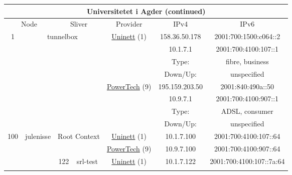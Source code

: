 \begin{small}
\begin{center}
\begin{longtable}{|c|c|c|c|c|c|c|c|}
\endfirsthead
\hline
 \multicolumn{8}{|c|}{\textbf{Universitetet i Agder (continued)}} \\ \hline
 \multicolumn{2}{|p{8em}|}{Node} & \multicolumn{2}{|p{8em}|}{Sliver} & \multicolumn{2}{|p{8em}|}{Provider} & IPv4 & IPv6 \\ \hline
\endhead
 \multirow{8}{*}{\tiny{1}} & \multicolumn{3}{|c|}{\multirow{8}{*}{\tiny{tunnelbox}}} & \multicolumn{2}{|c|}{\multirow{4}{*}{\tiny{\href{https://www.uninett.no}{Uninett} (1)}}} & \tiny{158.36.50.178} & \tiny{2001:700:1500:c064::2} \\* \cline{7-7}\cline{8-8}
  & \multicolumn{3}{|c|}{} & \multicolumn{2}{|c|}{} & \tiny{10.1.7.1} & \tiny{2001:700:4100:107::1} \\* \cline{7-7}\cline{8-8}
  & \multicolumn{3}{|c|}{} & \multicolumn{2}{|c|}{} & Type: & fibre, business \\* \cline{7-7}\cline{8-8}
  & \multicolumn{3}{|c|}{} & \multicolumn{2}{|c|}{} & Down/Up:  & unspecified \\* \cline{5-5}\cline{6-6}\cline{7-7}\cline{8-8}
  & \multicolumn{3}{|c|}{} & \multicolumn{2}{|c|}{\multirow{4}{*}{\tiny{\href{http://www.powertech.no}{PowerTech} (9)}}} & \tiny{195.159.203.50} & \tiny{2001:840:490a::50} \\* \cline{7-7}\cline{8-8}
  & \multicolumn{3}{|c|}{} & \multicolumn{2}{|c|}{} & \tiny{10.9.7.1} & \tiny{2001:700:4100:907::1} \\* \cline{7-7}\cline{8-8}
  & \multicolumn{3}{|c|}{} & \multicolumn{2}{|c|}{} & Type: & ADSL, consumer \\* \cline{7-7}\cline{8-8}
  & \multicolumn{3}{|c|}{} & \multicolumn{2}{|c|}{} & Down/Up:  & unspecified \\ \hline
 \multirow{20}{*}{\tiny{100}} & \multicolumn{1}{|l|}{\multirow{20}{*}{\tiny{julenisse}}} & \multicolumn{2}{|c|}{\multirow{2}{*}{\tiny{Root Context}}} & \multicolumn{2}{|c|}{\tiny{\href{https://www.uninett.no}{Uninett} (1)}} & \tiny{10.1.7.100} & \tiny{2001:700:4100:107::64} \\* \cline{5-5}\cline{6-6}\cline{7-7}\cline{8-8}
  &  & \multicolumn{2}{|c|}{} & \multicolumn{2}{|c|}{\tiny{\href{http://www.powertech.no}{PowerTech} (9)}} & \tiny{10.9.7.100} & \tiny{2001:700:4100:907::64} \\* \cline{3-3}\cline{4-4}\cline{5-5}\cline{6-6}\cline{7-7}\cline{8-8}
  &  & \multirow{2}{*}{\tiny{122}} & \multicolumn{1}{|l|}{\multirow{2}{*}{\tiny{srl-test}}} & \multicolumn{2}{|c|}{\tiny{\href{https://www.uninett.no}{Uninett} (1)}} & \tiny{10.1.7.122} & \tiny{2001:700:4100:107::7a:64} \\* \cline{5-5}\cline{6-6}\cline{7-7}\cline{8-8}

\end{longtable}
\end{center}
\end{small}
